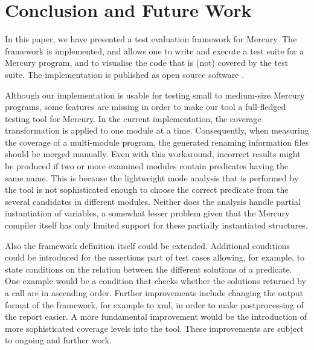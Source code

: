 \documentclass[british]{llncs}
\begin{document}
\section{Conclusion and Future Work}

In this paper, we have presented a test evaluation framework for Mercury. The framework is implemented, and allows one to write and execute a test suite for a Mercury program, and to visualise the code that is (not) covered by the test suite. The implementation is published as open source software \cite{Biener:MercuryTest}. 


Although our implementation is usable for testing small to medium-size Mercury programs, some features are missing in order to make our tool a full-fledged testing tool for Mercury. In the current implementation, the coverage transformation is applied to one module at a time. Consequently, when measuring the coverage of a multi-module program, the generated renaming information files should be merged manually. Even with this workaround, incorrect
results might be produced if two or more examined modules contain predicates having the same name. This is because the lightweight mode analysis that is performed by the tool is not sophisticated enough to choose the correct predicate from
the several candidates in different modules. Neither does the analysis handle partial
instantiation of variables, a somewhat lesser problem given that the Mercury compiler itself has only limited support for these partially instantiated structures.



Also the framework definition itself could be extended. 
Additional conditions could be introduced for the assertions
part of test cases allowing, for example, to state conditions on the relation between the different
solutions of a predicate. One example would be a condition that
checks whether the solutions returned by a call are in ascending order. Further improvements include changing the output format of the framework, for example to xml, in order to make postprocessing of the report easier. A more fundamental improvement would be the introduction of more sophisticated coverage levels into the tool. These improvements are subject to ongoing and further work.
\end{document}
